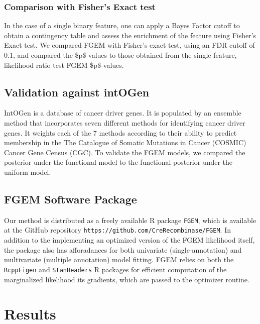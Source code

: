 \subsubsection{Comparison with Fisher's Exact test}\label{sec:orge6f1632}

In the case of a single binary feature, one can apply a Bayes Factor cutoff to obtain a contingency table and assess the enrichment of the feature using Fisher's Exact test.
We compared FGEM with Fisher's exact test, using an FDR cutoff of 0.1, and compared the \$p\$-values to those obtained from the single-feature, likelihood ratio test FGEM \$p\$-values.

\subsection{Validation against intOGen}\label{sec:orgd8b4e10}

IntOGen is a database of cancer driver genes\cite{gonzalez-perez13_intog_mutat_ident_cancer_driver}.  It is populated by an ensemble method that incorporates seven different methods for identifying cancer driver genes.  
It weights each of the 7 methods according to their ability to predict membership in the The Catalogue of Somatic Mutations in Cancer (COSMIC) Cancer Gene Census (CGC)\cite{COSMIC}.
To validate the FGEM models, we compared the posterior under the functional model to the functional posterior under the uniform model.


\subsection{FGEM Software Package}\label{sec:org56b3320}

Our method is distributed as a freely available R package\cite{Rlang} \texttt{FGEM}, which is available at the GitHub repository \texttt{https://github.com/CreRecombinase/FGEM}.  In addition to the implementing an optimized version of the FGEM likelihood itself, the package also has afforadances for both univariate (single-annotation) and multivariate (multiple annotation) model fitting.  FGEM relies on both the \texttt{RcppEigen}\cite{RcppEigen} and  \texttt{StanHeaders} R packages for efficient computation of the marginalized likelihood its gradients, which are passed to the optimizer routine.  


\section{Results}\label{sec:org6fb4837}

